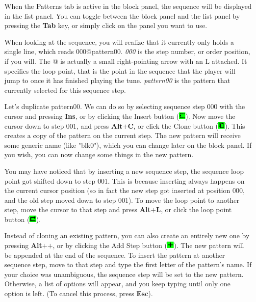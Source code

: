 \documentclass[12pt]{report}	%
\begin{document}
When the Patterns tab is active in the block panel, the sequence will be displayed in the list panel. You can toggle between the block panel and the list panel by pressing the \textbf{Tab} key, or simply click on the panel you want to use.

When looking at the sequence, you will realize that it currently only holds a single line, which reads 000@pattern00. \textit{000} is the step number, or order position, if you will. The @ is actually a small right-pointing arrow with an L attached. It specifies the loop point, that is the point in the sequence that the player will jump to once it has finished playing the tune. \textit{pattern00} is the pattern that currently selected for this sequence step.

Let's duplicate pattern00. We can do so by selecting sequence step 000 with the cursor and pressing \textbf{Ins}, or by clicking the Insert button ({\includegraphics[width=10pt]{button_insert}}). Now move the cursor down to step 001, and press \textbf{Alt\(\bm{+}\)C}, or click the Clone button ({\includegraphics[width=10pt]{button_clone}}). This creates a copy of the pattern on the current step. The new pattern will receive some generic name (like "blk0"), which you can change later on the block panel. If you wish, you can now change some things in the new pattern.

You may have noticed that by inserting a new sequence step, the sequence loop point got shifted down to step 001. This is because inserting always happens on the current cursor position (so in fact the new step got inserted at position 000, and the old step moved down to step 001). To move the loop point to another step, move the cursor to that step and press \textbf{Alt\(\bm{+}\)L}, or click the loop point button ({\includegraphics[width=10pt]{button_looppoint}}).

Instead of cloning an existing pattern, you can also create an entirely new one by pressing \textbf{Alt\(\bm{+}\)\(\bm{+}\)}, or by clicking the Add Step button ({\includegraphics[width=10pt]{button_plus}}). The new pattern will be appended at the end of the sequence. To insert the pattern at another sequence step, move to that step and type the first letter of the pattern's name. If your choice was unambiguous, the sequence step will be set to the new pattern. Otherwise, a list of options will appear, and you keep typing until only one option is left. (To cancel this process, press \textbf{Esc}).
\end{document}
